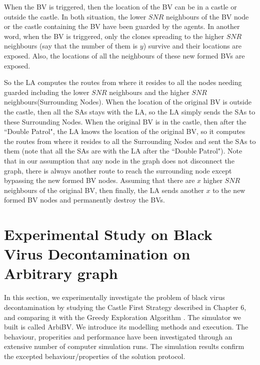 
When the BV is triggered, then the location of the BV can be in a castle or outside the castle. In both situation, the lower $SNR$ neighbours of the BV node or the castle containing the BV have been guarded by the agents. In another word, when the BV is triggered, only the clones spreading to the higher $SNR$ neighbours (say that the number of them is $y$) survive and their locations are exposed. Also, the locations of all the neighbours of these new formed BVs are exposed. 

So the LA computes the routes from where it resides to all the nodes needing guarded including the lower $SNR$ neighbours and the higher $SNR$ neighbours(Surrounding Nodes). When the location of the original BV is outside the castle, then all the SAs stays with the LA, so the LA simply sends the SAs to these Surrounding Nodes. When the original BV is in the castle, then after the  ``Double Patrol", the LA knows the location of the original BV, so it computes the routes from where it resides to all the Surrounding Nodes and sent the SAs to them (note that all the SAs are with the LA after the  ``Double Patrol"). Note that in our assumption that any node in the graph does not disconnect the graph, there is always another route to reach the surrounding node  except bypassing the new formed BV nodes. Assuming that there are $x$ higher $SNR$ neighbours of the original BV, then finally, the LA sends another $x$ to the new formed BV nodes and permanently destroy the BVs.



\section{Experimental Study on Black Virus Decontamination on Arbitrary graph}
In this section, we experimentally investigate the problem of black virus decontamination by studying the Castle First Strategy described in Chapter 6, and comparing it with the Greedy Exploration Algorithm \cite{cai}.
The simulator we built is called ArbiBV. We introduce its modelling methods and execution. The behaviour, properities and performance have been investigated through an extensive number of computer simulation runs. The simulation results confirm the excepted behaviour/properties of the solution protocol. 
